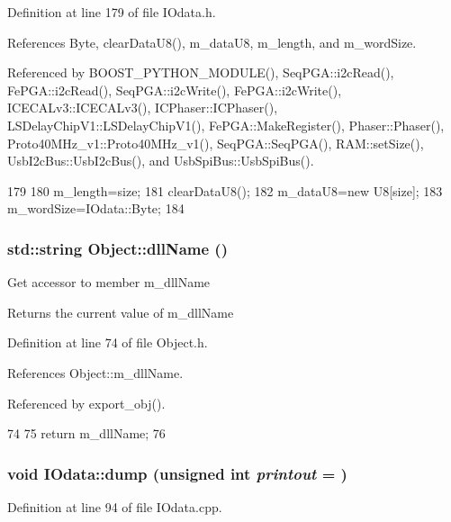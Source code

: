 Definition at line 179 of file IOdata.h.

References Byte, clearDataU8(), m\_\-dataU8, m\_\-length, and m\_\-wordSize.

Referenced by BOOST\_\-PYTHON\_\-MODULE(), SeqPGA::i2cRead(), FePGA::i2cRead(), SeqPGA::i2cWrite(), FePGA::i2cWrite(), ICECALv3::ICECALv3(), ICPhaser::ICPhaser(), LSDelayChipV1::LSDelayChipV1(), FePGA::MakeRegister(), Phaser::Phaser(), Proto40MHz\_\-v1::Proto40MHz\_\-v1(), SeqPGA::SeqPGA(), RAM::setSize(), UsbI2cBus::UsbI2cBus(), and UsbSpiBus::UsbSpiBus().


\begin{DoxyCode}
179                                     {
180     m_length=size;
181     clearDataU8();
182     m_dataU8=new U8[size];
183     m_wordSize=IOdata::Byte;
184   }
\end{DoxyCode}
\hypertarget{classObject_a2e3947f2870094c332d7454117f3ec63}{
\subsubsection[{dllName}]{\setlength{\rightskip}{0pt plus 5cm}std::string Object::dllName ()}}
\label{classObject_a2e3947f2870094c332d7454117f3ec63}
Get accessor to member m\_\-dllName \begin{DoxyReturn}{Returns}
the current value of m\_\-dllName 
\end{DoxyReturn}


Definition at line 74 of file Object.h.

References Object::m\_\-dllName.

Referenced by export\_\-obj().


\begin{DoxyCode}
74                        {
75     return m_dllName;
76   }  
\end{DoxyCode}
\hypertarget{classIOdata_a208e24222bf2044a4ff8bbb1a6bdc13b}{
\subsubsection[{dump}]{\setlength{\rightskip}{0pt plus 5cm}void IOdata::dump (unsigned int {\em printout} = {})}}
\label{classIOdata_a208e24222bf2044a4ff8bbb1a6bdc13b}


Definition at line 94 of file IOdata.cpp.


